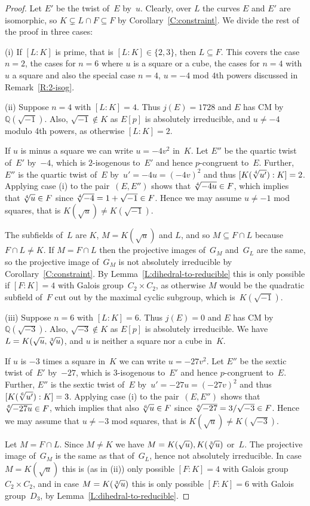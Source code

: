 \documentclass[12pt, reqno]{amsart}
\newcommand{\Q}{\mathbb{Q}}
\numberwithin{equation}{section}
\theoremstyle{definition}
\theoremstyle{remark}
\begin{document}
\begin{proof} 
Let $E'$ be the twist of~$E$ by~$u$. Clearly, over $L$ the curves $E$ and $E'$ are isomorphic, so $K\subsetneq L\cap F\subseteq F$
by Corollary~\ref{C:constraint}.
We divide the rest of the proof in three cases:

(i) If $[L : K]$ is prime, that is $[L : K] \in \{2, 3\}$, then $L \subseteq F$. This covers the case $n=2$, the cases for $n=6$  where $u$ is a square or a cube, the cases for $n=4$ with $u$ a square
and also the special case $n=4$, $u=-4$ mod $4$th powers discussed in
Remark~\ref{R:2-isog}. 

(ii) Suppose $n=4$ with $[L : K]=4$. Thus $j(E) = 1728$ and $E$ has CM
by~$\Q(\sqrt{-1})$. Also, $\sqrt{-1} \not\in K$ as $E[p]$ is
absolutely irreducible, and $u \neq -4$ modulo 4th powers, as otherwise
$[L:K]=2$.

If $u$ is minus a square we can write $u=-4v^2$ in~$K$. Let $E''$ be the
quartic twist of~$E'$ by~$-4$, which is $2$-isogenous to~$E'$ and hence $p$-congruent
to~$E$. Further, $E''$ is the quartic twist of~$E$ by~$u' =  -4u = (-4v)^2$ and thus $[K(\root 4 \of {u'}) : K] = 2$.
Applying case (i)
to the pair~$(E,E'')$ shows that $\root4\of{-4u}\in F$, which implies
that $\root4\of{u}\in F$ since $\root4\of{-4}=1+\sqrt{-1}\in F$.
Hence we may assume $u \neq -1$ mod squares, that is $K(\sqrt{u}) \not= K(\sqrt{-1})$.

The subfields of~$L$ are $K$, $M=K(\sqrt{u})$ and $L$, and so $M
\subseteq F \cap L$ because $F \cap L \neq K$.  If $M=F\cap L$ then
the projective images of~$G_M$ and~$G_L$ are the same, so the
projective image of~$G_M$ is not absolutely irreducible by
Corollary~\ref{C:constraint}.  By Lemma~\ref{L:dihedral-to-reducible}
this is only possible if $[F:K]=4$ with Galois group~$C_2\times C_2$,
as otherwise $M$ would be the quadratic subfield of~$F$ cut out by the
maximal cyclic subgroup, which is~$K(\sqrt{-1})$.

(iii) Suppose $n=6$ with $[L : K]=6$. Thus $j(E) = 0$ and $E$ has CM
by $\Q(\sqrt{-3})$. Also, $\sqrt{-3} \not\in K$ as $E[p]$ is
absolutely irreducible. We have $L = K(\sqrt{u},\root 3 \of u)$, and
$u$ is neither a square nor a cube in~$K$.

If $u$ is $-3$ times a square in~$K$ we can write $u=-27v^2$. Let
$E''$ be the sextic twist of~$E'$ by~$-27$, which is $3$-isogenous
to~$E'$ and hence $p$-congruent to~$E$.  Further, $E''$ is the sextic
twist of~$E$ by~$u' = -27u = (-27v)^2$ and thus $[K(\root 6 \of {u'})
  : K] = 3$.  Applying case (i) to the pair~$(E,E'')$ shows that
$\root6\of{-27u}\in F$, which implies that also $\root6\of{u}\in F$
since $\root6\of{-27}=3/\sqrt{-3}\in F$.  Hence we may assume that $u
\neq -3$ mod squares, that is $K(\sqrt{u}) \not= K(\sqrt{-3})$.

Let $M = F \cap L$.  Since $M\not=K$ we have $M = K(\sqrt{u}), K(\root
3 \of{u})$ or~$L$.  The projective image of~$G_M$ is the same as that
of~$G_L$, hence not absolutely irreducible.  In case $M=K(\sqrt{u})$
this is (as in (ii)) only possible $[F:K]=4$ with Galois
group~$C_2\times C_2$, and in case $M=K(\root3\of{u})$ this is only
possible $[F:K]=6$ with Galois group~$D_3$, by
Lemma~\ref{L:dihedral-to-reducible}.
\end{proof}
\end{document}

